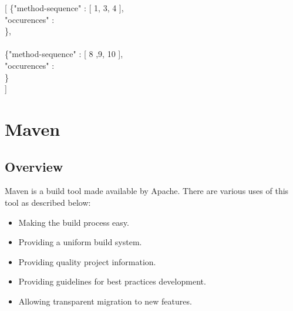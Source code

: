 [ \{"method-sequence" : [ 1, 3, 4 ],\\
\tab   "occurences" :\\
\tab{}\},\\
\\
  \{"method-sequence" : [ 8 ,9, 10 ],\\
\tab   "occurences" :\\
\tab{}\}\\
]

\section{Maven}
\subsection{Overview}
Maven\cite{Maven} is a build tool made available by Apache. There are various uses of this tool as described below:

\begin{itemize}
\item Making the build process easy.
\item Providing a uniform build system.
\item Providing quality project information.
\item Providing guidelines for best practices development.
\item Allowing transparent migration to new features.
\end{itemize}

